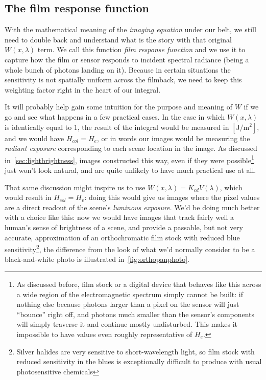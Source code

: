 \subsection{The film response function}\label{sec:filmrespfunc}

With the mathematical meaning of the \textsl{imaging equation} under our belt, 
we still need to double back and understand what is the story with that original $W(x,\lambda)$ term. 
We call this function \textsl{\gls{film response function}} 
and we use it to capture how the film or sensor responds to incident \gls{spectral} \gls{radiance}
(being a whole bunch of photons landing on it). 
Because in certain situations the sensitivity is not spatially uniform across the \gls{filmback}, 
we need to keep this weighting factor right in the heart of our integral.

It will probably help gain some intuition for the purpose and meaning 
of $W$ if we go and see what happens in a few practical cases.
In the case in which $W(x, \lambda)$ is identically equal to $1$, the
result of the integral would be measured in $[\unit{\joule\per\square\meter}]$,
and we would have $H_{col} = H_e$, or in words our images would be measuring the 
\textsl{radiant \gls{exposure}} corresponding to each scene location in the image. 
As discussed in~\cref{sec:lightbrightness}, images constructed this way, even 
if they were possible\footnote{
	As discussed before, film stock or a digital device that behaves like this across a wide region
	of the electromagnetic spectrum simply cannot be built: if nothing else because photons
	larger than a pixel on the sensor will just ``bounce'' right off, and photons much smaller
	than the sensor's components will simply traverse it and continue mostly undisturbed.
	This makes it impossible to have values even roughly representative of $H_e$.}  
just won't look natural, and are quite unlikely to have much practical use at all.

That same discussion might inspire us to use $W(x,\lambda) = K_{cd} V(\lambda)$,
which would result in $H_{col} = H_v$: doing this would give us images where the
pixel values are a direct readout of the scene's \textsl{luminous \gls{exposure}}.
We'd be doing much better with a choice like this: now we would have images that track 
fairly well a human's sense of brightness of a scene, 
and provide a passable, but not very accurate, approximation of
an orthochromatic film stock with reduced blue sensitivity\footnote{Silver halides
	are very sensitive to short-wavelength light, so film stock with reduced
	sensitivity in the blues is exceptionally difficult to produce with usual
	photosensitive chemicals}, 
the difference from the look of what we'd normally consider to be a black-and-white
photo is illustrated in~\cref{fig:orthopanphoto}.


